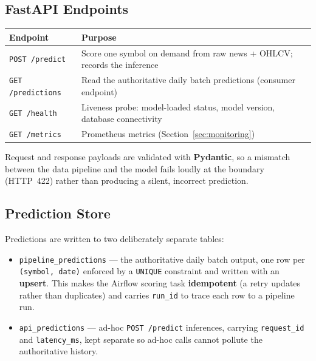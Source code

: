 \documentclass[11pt,a4paper]{article}
\begin{document}
\subsection{FastAPI Endpoints}

\begin{table}[H]
\centering
\begin{tabular}{@{}lp{9.5cm}@{}}
\toprule
\textbf{Endpoint} & \textbf{Purpose} \\
\midrule
\texttt{POST /predict}     & Score one symbol on demand from raw news + OHLCV; records the inference \\
\texttt{GET /predictions}  & Read the authoritative daily batch predictions (consumer endpoint) \\
\texttt{GET /health}       & Liveness probe: model-loaded status, model version, database connectivity \\
\texttt{GET /metrics}      & Prometheus metrics (Section~\ref{sec:monitoring}) \\
\bottomrule
\end{tabular}
\end{table}

Request and response payloads are validated with \textbf{Pydantic}, so a
mismatch between the data pipeline and the model fails loudly at the boundary
(HTTP~422) rather than producing a silent, incorrect prediction.

\subsection{Prediction Store}

Predictions are written to two deliberately separate tables:

\begin{itemize}[nosep]
  \item \texttt{pipeline\_predictions} --- the authoritative daily batch output,
        one row per \texttt{(symbol, date)} enforced by a \texttt{UNIQUE}
        constraint and written with an \textbf{upsert}. This makes the Airflow
        scoring task \textbf{idempotent} (a retry updates rather than
        duplicates) and carries \texttt{run\_id} to trace each row to a pipeline
        run.
  \item \texttt{api\_predictions} --- ad-hoc \texttt{POST /predict} inferences,
        carrying \texttt{request\_id} and \texttt{latency\_ms}, kept separate so
        ad-hoc calls cannot pollute the authoritative history.
\end{itemize}
\end{document}
